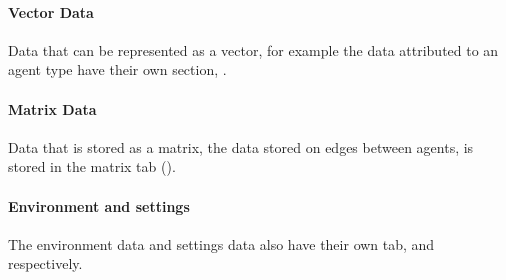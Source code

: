 \paragraph{Vector Data} 
Data that can be represented as a vector, for example the data attributed to an agent type have their own section, .
\paragraph{Matrix Data}
Data that is stored as a matrix, the data stored on edges between agents, is stored in the matrix tab ().
\paragraph{Environment and settings}
The environment data and settings data also have their own tab,  and  respectively.

